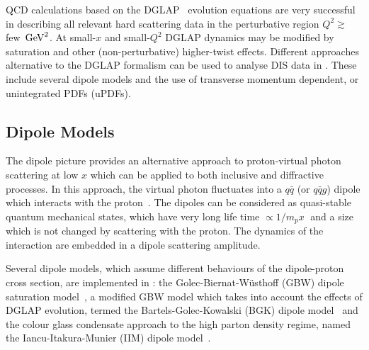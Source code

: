 

QCD calculations based on the DGLAP~\cite{Gribov:1972ri,Gribov:1972rt,Lipatov:1974qm,
Dokshitzer:1977sg,Altarelli:1977zs} evolution equations are very successful in describing
all relevant hard scattering data in the perturbative region $Q^2 \gtrsim $ few $ \,\text{Ge\hspace{-.08em}V}^2$.
At small-$x$ and small-$Q^2$ DGLAP dynamics may be modified
 by saturation and other (non-perturbative) higher-twist effects.
%
Different approaches alternative to the DGLAP formalism can be used to analyse DIS data in \fitter.
These include several dipole models and the use of 
transverse momentum dependent, or unintegrated PDFs (uPDFs).

\subsection{Dipole Models}

The dipole picture provides an alternative approach to proton-virtual photon
 scattering at low $x$ which can be applied to both inclusive and 
diffractive processes.
 In this approach, the virtual photon fluctuates into a $q\bar q$ (or $q\bar q g$) 
 dipole which interacts with the proton~\cite{NNZ:91,Mueller:1993rr}.  
The dipoles can be considered as quasi-stable quantum mechanical states, which have very long 
life time $\propto 1/m_p x\;$ and a size which is not changed by scattering with the proton.
The dynamics of the interaction are embedded in a dipole scattering amplitude.

Several dipole models, which assume different behaviours of the dipole-proton 
cross section, are implemented in \fitter:
the Golec-Biernat-W\"usthoff (GBW)
dipole saturation model~\cite{Golec-Biernat:1998js},
a modified GBW model which takes into account the effects of  
DGLAP evolution, termed the Bartels-Golec-Kowalski (BGK) dipole model~\cite{Bartels:2002cj}
and the colour glass condensate approach to the high parton density 
regime, named the Iancu-Itakura-Munier (IIM) dipole model~\cite{Iancu:2003ge}.

